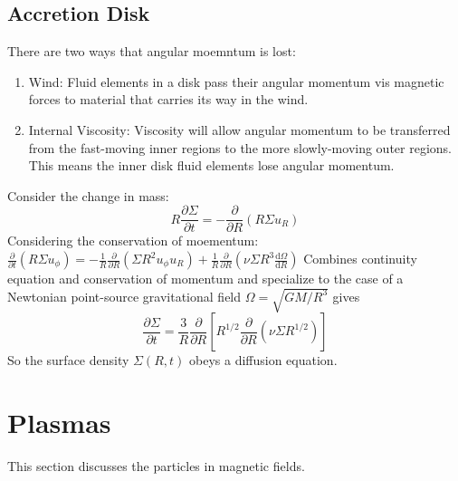 \documentclass[12pt,a4paper]{article}
\begin{document}
\subsection{ Accretion Disk}
There are two ways that angular moemntum is lost:
\begin{enumerate}
    \item Wind: Fluid elements in a disk pass their angular momentum vis magnetic forces to material that carries its way in the wind.
    \item Internal Viscosity: Viscosity will allow angular momentum to be transferred from the fast-moving inner regions to the more slowly-moving outer regions. This means the inner disk fluid elements lose angular momentum.
\end{enumerate}
Consider the change in mass:
$$R \frac{\partial \Sigma}{\partial t}=-\frac{\partial}{\partial R}\left(R \Sigma u_R\right)$$
Considering the conservation of moementum:
$\frac{\partial}{\partial t}\left(R \Sigma u_\phi\right)=-\frac{1}{R} \frac{\partial}{\partial R}\left(\Sigma R^2 u_\phi u_R\right)+\frac{1}{R} \frac{\partial}{\partial R}\left(\nu \Sigma R^3 \frac{\mathrm{d} \Omega}{\mathrm{d} R}\right)$
Combines continuity equation and conservation of momentum and specialize to the case of a Newtonian point-source gravitational field $\Omega=\sqrt{G M / R^3}$ gives
$$
\frac{\partial \Sigma}{\partial t}=\frac{3}{R} \frac{\partial}{\partial R}\left[R^{1 / 2} \frac{\partial}{\partial R}\left(\nu \Sigma R^{1 / 2}\right)\right]
$$
So the surface density $\Sigma(R, t)$ obeys a diffusion equation.

\section{Plasmas}
This section discusses the particles in magnetic fields.
\end{document}

